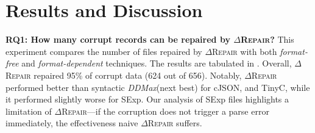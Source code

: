 \documentclass[acmsmall,screen,review,anonymous]{acmart}
\newcommand{\formatfree}{format-free\xspace}
\newcommand{\formatdependent}{format-dependent\xspace}
\newcommand{\dtask}{data repair\xspace}
\newcommand{\approach}{\textsc{$\Delta$Repair}\xspace}
\newcommand{\ddmax}{\textit{DDMax}\xspace}
\newcommand{\drepair}{\approach}
\begin{document}
\section{Results and Discussion}
\label{sec:discussion}
\noindent\textbf{RQ1: How many corrupt records can be repaired by \drepair?}
This experiment compares the number of files repaired by \drepair with both
\emph{\formatfree} and \emph{\formatdependent}
techniques. The results are tabulated in .
Overall, \drepair repaired 95\% of corrupt data (624 out of 656).
Notably, \drepair performed better than syntactic \ddmax (next best)
for cJSON, and TinyC, while it performed slightly worse for SExp.
Our analysis of SExp files
highlights a limitation of \drepair---if the corruption does not trigger a parse
error immediately, the effectiveness naive \drepair suffers.

%
\end{document}

